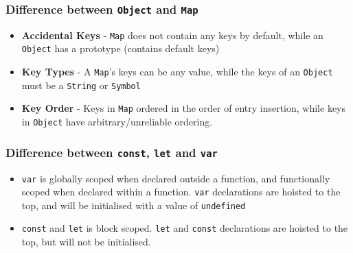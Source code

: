 \documentclass[12pt, a4paper]{article}
\newcommand{\code}[1]{\texttt{#1}}
\begin{document}
\subsubsection*{Difference between \code{Object} and \code{Map}}
\begin{itemize}
  \item \textbf{Accidental Keys} - \code{Map} does not contain any keys by default, while an \code{Object} has a prototype (contains default keys)
  \item \textbf{Key Types} - A \code{Map}'s keys can be any value, while the keys of an \code{Object} must be a \code{String} or \code{Symbol}
  \item \textbf{Key Order} - Keys in \code{Map} ordered in the order of entry insertion, while keys in \code{Object} have arbitrary/unreliable ordering. 
\end{itemize}

\subsubsection*{Difference between \code{const}, \code{let} and \code{var}}
\begin{itemize}
  \item \code{var} is globally scoped when declared outside a function, and functionally scoped when declared within a function.\newline
        \code{var} declarations are hoisted to the top, and will be initialised with a value of \code{undefined}
  \item \code{const} and \code{let} is block scoped.\newline
        \code{let} and \code{const} declarations are hoisted to the top, but will not be initialised.
\end{itemize}
\end{document}
